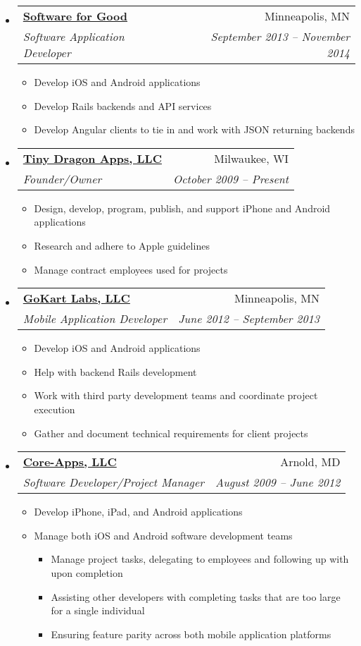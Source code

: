 \documentclass[letterpaper,12pt]{article}
\makeatletter
\newcommand{\resitem}[1]{\item #1 \vspace{-2pt}}
\newcommand{\ressubheading}[4]{
      \begin{tabular*}{6.5in}{l@{\extracolsep{\fill}}r}
        \textbf{#1} & #2 \\
        \textit{#3} & \textit{#4} \\
      \end{tabular*}\vspace{-6pt}}
\makeatother
\begin{document}
\begin{itemize}
{\begin{itemize}
    \end{itemize}
    }
  \item
    \ressubheading{\href{http://softwareforgood.com/}{Software for Good}}{Minneapolis, MN}{Software Application Developer}{September 2013 -- November 2014}
    { \footnotesize
    \begin{itemize}
        \resitem{Develop iOS and Android applications}
        \resitem{Develop Rails backends and API services}
        \resitem{Develop Angular clients to tie in and work with JSON returning backends}
    \end{itemize}
    }
  \item
    \ressubheading{\href{http://itunes.apple.com/WebObjects/MZStore.woa/wa/viewArtist?id=337595590}{Tiny Dragon Apps, LLC}}{Milwaukee, WI}{Founder/Owner}{October 2009 -- Present}
    { \footnotesize
    \begin{itemize}
        \resitem{Design, develop, program, publish, and support iPhone and Android applications}
        \resitem{Research and adhere to Apple guidelines}
        \resitem{Manage contract employees used for projects}
    \end{itemize}
    }
  \item
    \ressubheading{\href{http://www.gokartlabs.com}{GoKart Labs, LLC}}{Minneapolis, MN}{Mobile Application Developer}{June 2012 -- September 2013}
    { \footnotesize
    \begin{itemize}
        \resitem{Develop iOS and Android applications}
        \resitem{Help with backend Rails development}
        \resitem{Work with third party development teams and coordinate project execution}
        \resitem{Gather and document technical requirements for client projects}
    \end{itemize}
    }
  \item
    \ressubheading{\href{http://www.core-apps.com/Home.html}{Core-Apps, LLC}}{Arnold, MD}{Software Developer/Project Manager}{August 2009 -- June 2012}
    { \footnotesize
    \begin{itemize}
        \resitem{Develop iPhone, iPad, and Android applications}
        \resitem{Manage both iOS and Android software development teams}
        \begin{itemize}
            \resitem{Manage project tasks, delegating to employees and following  up with upon completion}
            \resitem{Assisting other developers with completing tasks that are too large for a single individual}
            \resitem{Ensuring feature parity across both mobile application platforms}

\end{itemize}
\end{itemize}}
\end{itemize}
\end{document}
